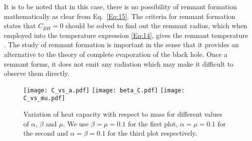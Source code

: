 \documentclass[aps,amsmath,amssymb,showpacs,showkeys]{revtex4}
\begin{document}
It is to be noted that in this case, there is no possibility of remnant 
formation mathematically as clear from Eq.\ \eqref{Eq:15}. The criteria for 
remnant formation states that $C_{BH}=0$ should be solved to find out the 
remnant radius, which when employed into the temperature expression 
\eqref{Eq:14}, gives the remnant temperature \cite{40}. The study of remnant 
formation is important in the sense that it provides an alternative to the 
theory of complete evaporation of the black hole. Once a remnant forms, it 
does not emit any radiation which may make it difficult to observe them 
directly. 
\begin{figure}[h!]
\texttt{[image: C\_vs\_a.pdf]}\hspace{0.5cm}
\texttt{[image: beta\_C.pdf]}\vspace{0.2cm}
\texttt{[image: C\_vs\_mu.pdf]}
\caption{ Variation of heat capacity with respect to mass for different 
values of $\alpha$, $\beta$ and $\mu$. We use $\beta= \mu = 0.1$ for the 
first plot, $\alpha = \mu = 0.1$ for the second and $\alpha = \beta = 0.1$ 
for the third plot respectively.}
\label{Fig02}
\end{figure}
\end{document}
